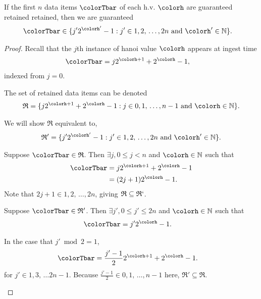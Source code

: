 \begin{lemma}
\label{thm:retained-equivalence}
If the first $n$ data items $\colorTbar$ of each h.v. $\colorh$ are guaranteed retained retained, then we are guaranteed 
\begin{align*}
\colorTbar
&\in
\{
  j'2^{\colorh'} - 1
  :
  j' \in 1,2,\,\ldots,2n
  \text{ and }
  \colorh' \in \mathbb{N}
\}.
\end{align*}
\end{lemma}
\begin{proof}

Recall that the $j$th instance of hanoi value $\colorh$ appears at ingest time 
\begin{align*}
\colorTbar
&= j2^{\colorh + 1} + 2^{\colorh} - 1,
\end{align*}
indexed from $j=0$.

The set of retained data items can be denoted
\begin{align*}
\mathfrak{R} =
\{
  j2^{\colorh + 1} + 2^{\colorh} - 1
  :
  j \in 0,1,\,\ldots,n-1
  \text{ and }
  \colorh \in \mathbb{N}
\}.
\end{align*}

We will show $\mathfrak{R}$ equivalent to,
\begin{align*}
\mathfrak{R}' =
\{
  j'2^{\colorh'} - 1
  :
  j' \in 1,2,\,\ldots,2n
  \text{ and }
  \colorh' \in \mathbb{N}
\}.
\end{align*}

\begin{proofpart}
Suppose $\colorTbar \in \mathfrak{R}$.
Then $\exists j,  0 \leq j < n$ and $\colorh \in \mathbb{N}$ such that
\begin{align*}
\colorTbar
&= j2^{\colorh + 1} + 2^{\colorh} - 1\\
&= (2j + 1)2^{\colorh} - 1.
\end{align*}
Note that $2j + 1 \in 1,2,\,\ldots,2n$, giving $\mathfrak{R} \subseteq \mathfrak{R}`$.
\end{proofpart}

\begin{proofpart}
Suppose $\colorTbar \in \mathfrak{R}'$.
Then $\exists j',  0 \leq j' \leq 2n$ and $\colorh \in \mathbb{N}$ such that
\begin{align*}
\colorTbar
&= j'2^{\colorh} - 1.
\end{align*}

In the case that $j' \bmod 2 = 1$, 
\begin{align*}
\colorTbar
&= \frac{j'-1}{2} 2^{\colorh + 1} + 2^{\colorh} - 1.
\end{align*}
for $j' \in 1, 3, \,\ldots 2n-1$.
Because $\frac{j'-1}{2} \in 0, 1, \, \ldots, n - 1$ here, $\mathfrak{R}' \subseteq \mathfrak{R}$.


\end{proofpart}
\end{proof}
